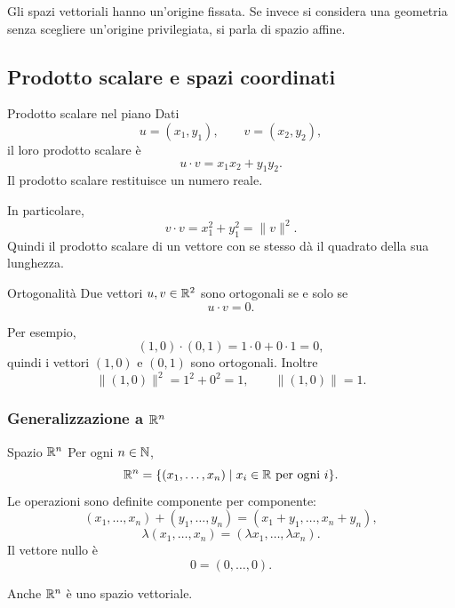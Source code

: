 \documentclass[a4paper]{article}
\begin{document}
Gli spazi vettoriali hanno un'origine fissata. Se invece si considera una geometria senza scegliere un'origine privilegiata, si parla di spazio affine.

\subsection{Prodotto scalare e spazi coordinati}

\begin{snippetdefinition}{Prodotto scalare nel piano}
    Dati
    \[
        u=(x_1,y_1),
        \qquad
        v=(x_2,y_2),
    \]
    il loro prodotto scalare è
    \[
        u\cdot v = x_1x_2+y_1y_2.
    \]
    Il prodotto scalare restituisce un numero reale.
\end{snippetdefinition}

In particolare,
\[
    v\cdot v = x_1^2+y_1^2 = \|v\|^2.
\]
Quindi il prodotto scalare di un vettore con se stesso dà il quadrato della sua lunghezza.

\begin{snippetdefinition}{Ortogonalità}
    Due vettori \(u,v\in\mathbb{R}^2\) sono ortogonali se e solo se
    \[
        u\cdot v = 0.
    \]
\end{snippetdefinition}

Per esempio,
\[
    (1,0)\cdot(0,1)=1\cdot 0+0\cdot 1=0,
\]
quindi i vettori \((1,0)\) e \((0,1)\) sono ortogonali. Inoltre
\[
    \|(1,0)\|^2 = 1^2+0^2=1,
    \qquad
    \|(1,0)\|=1.
\]

\subsubsection{Generalizzazione a \texorpdfstring{\(\mathbb{R}^n\)}{Rn}}

\begin{snippetdefinition}{Spazio \(\mathbb{R}^n\)}
    Per ogni \(n\in\mathbb{N}\),
    \[
        \mathbb{R}^n
        =
        \{(x_1,\ldots,x_n)\mid x_i\in\mathbb{R} \text{ per ogni } i\}.
    \]
    Le operazioni sono definite componente per componente:
    \[
        (x_1,\ldots,x_n)+(y_1,\ldots,y_n)
        =
        (x_1+y_1,\ldots,x_n+y_n),
    \]
    \[
        \lambda(x_1,\ldots,x_n)
        =
        (\lambda x_1,\ldots,\lambda x_n).
    \]
    Il vettore nullo è
    \[
        0=(0,\ldots,0).
    \]
\end{snippetdefinition}

Anche \(\mathbb{R}^n\) è uno spazio vettoriale.
\end{document}
